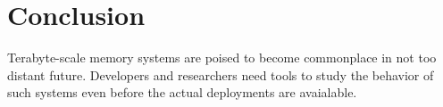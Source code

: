 \documentclass[twocolumn,11pt]{article}
\begin{document}
%




\section{Conclusion}
Terabyte-scale memory systems are poised to become commonplace in not too distant future.
Developers and researchers need tools to study the behavior of such systems even before the actual
deployments are avaialable. 
\end{document}
